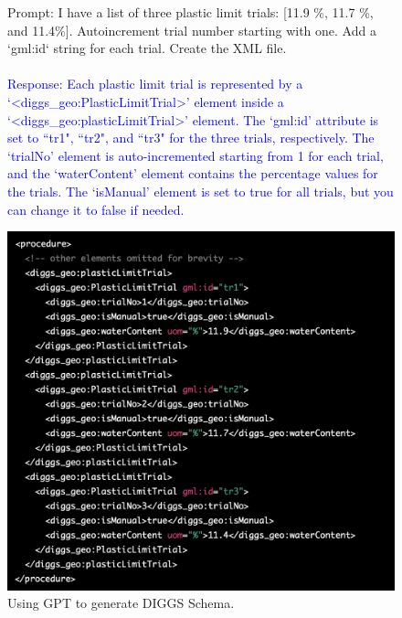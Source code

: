 \documentclass[12pt]{article}
\begin{document}
\begin{figure}[ht]
    \begin{minipage}{0.48\textwidth}
    \textcolor{RedOrange}{Prompt: I have a list of three plastic limit trials: [11.9 \%, 11.7 \%, and 11.4\%]. Autoincrement trial number starting with one. Add a `gml:id` string for each trial. Create the XML file. }
    \\\\
    \textcolor{blue}{Response: Each plastic limit trial is represented by a `\textless diggs\_geo:PlasticLimitTrial\textgreater' element inside a `\textless diggs\_geo:plasticLimitTrial\textgreater' element. The `gml:id' attribute is set to ``tr1", ``tr2", and ``tr3" for the three trials, respectively. The `trialNo' element is auto-incremented starting from 1 for each trial, and the `waterContent' element contains the percentage values for the trials. The `isManual' element is set to true for all trials, but you can change it to false if needed.}
    \end{minipage}%
    \hspace{0.5cm}%
    \begin{minipage}[r]{0.45\textwidth}
    \includegraphics[width = \linewidth]{figs/diggs.png}
    \end{minipage}
    \caption{Using GPT to generate DIGGS Schema.}
    \label{fig:diggs}
\end{figure}
\end{document}
